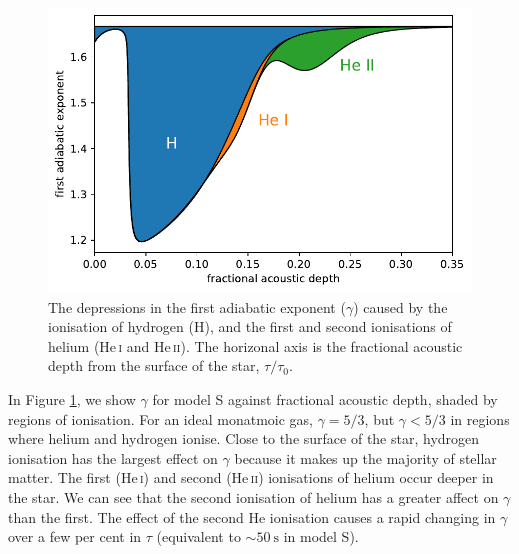 \begin{figure}[tb]
    \centering
    \includegraphics{figures/adiabatic-ionisation-regions.pdf}
    \caption[The depressions in the first adiabatic exponent caused by the ionisation of hydrogen and helium.]{The depressions in the first adiabatic exponent (\(\gamma\)) caused by the ionisation of hydrogen (H), and the first and second ionisations of helium (He\,\textsc{i} and He\,\textsc{ii}). The horizonal axis is the fractional acoustic depth from the surface of the star, \(\tau/\tau_0\).}
    \label{fig:gamma-zones}
\end{figure}

In Figure \ref{fig:gamma-zones}, we show \(\gamma\) for model S against fractional acoustic depth, shaded by regions of ionisation. For an ideal monatmoic gas, \(\gamma=5/3\), but \(\gamma < 5/3\) in regions where helium and hydrogen ionise. Close to the surface of the star, hydrogen ionisation has the largest effect on \(\gamma\) because it makes up the majority of stellar matter. The first (He\,\textsc{i}) and second (He\,\textsc{ii}) ionisations of helium occur deeper in the star. We can see that the second ionisation of helium has a greater affect on \(\gamma\) than the first. The effect of the second He ionisation causes a rapid changing in \(\gamma\) over a few per cent in \(\tau\) (equivalent to \(\sim \SI{50}{\second}\) in model S).

